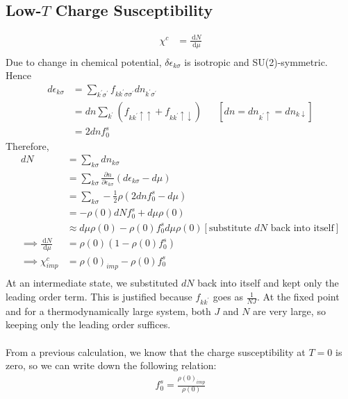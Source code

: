 \documentclass[twoside,11pt]{report}
\numberwithin{equation}{section}
\begin{document}
\subsection{Low-\(T\) Charge Susceptibility}
\begin{equation}\begin{aligned}
	\chi^c &= \frac{\:\mathrm{d}N}{\:\mathrm{d}\mu}\\
\end{aligned}\end{equation}
Due to change in chemical potential, \(\delta\epsilon_{k\sigma}\) is isotropic and SU(2)-symmetric. Hence
\begin{equation}\begin{aligned}
	d\epsilon_{k\sigma} &= \sum_{k^\prime\sigma^\prime}f_{kk^\prime\sigma\sigma^\prime}d n_{k^\prime\sigma^\prime}\\
			    &= d n\sum_{k^\prime}\left(f_{kk^\prime\uparrow \uparrow} + f_{kk^\prime \uparrow \downarrow}\right) && \left[dn = dn_{k^\prime \uparrow} = dn_{k \downarrow}\right] \\
			    &= 2dn f_0^s
\end{aligned}\end{equation}
Therefore,
\begin{equation}\begin{aligned}
	dN &= \sum_{k\sigma}dn_{k\sigma} \\
	   &= \sum_{k\sigma}\frac{\partial{n}}{\partial{\epsilon_{k\sigma}}}\left( d\epsilon_{k\sigma} - d\mu \right) \\
	   &= \sum_{k\sigma}-\frac{1}{2}\rho\left(2dn f_0^s - d\mu \right) \\
	   &= -\rho(0) d N f_0^s + d\mu \rho(0) \\
	   &\approx d\mu \rho(0) - \rho(0) f_0^s d\mu \rho(0) \left[\text{substitute \(dN\) back into itself}\right] \\
	\implies \frac{\:\mathrm{d}N}{\:\mathrm{d}\mu} &= \rho(0)\left( 1 - \rho(0)f_0^s \right) \\
	\implies \chi^c_{imp} &= \rho(0)_{imp} - \rho(0)f_0^s \\
\end{aligned}\end{equation}
At an intermediate state, we substituted \(dN\) back into itself and kept only the leading order term. This is justified because \(f_{kk^\prime}\) goes as \(\frac{1}{N J}\). At the fixed point and for a thermodynamically large system, both \(J\) and \(N\) are very large, so keeping only the leading order suffices.
\\\\From a previous calculation, we know that the charge susceptibility at \(T=0\) is zero, so we can write down the following relation:
\begin{equation}\begin{aligned}
	\label{fp_constraint}
	f_0^s = \frac{\rho(0)_{imp}}{\rho(0)}
\end{aligned}\end{equation}
\end{document}
